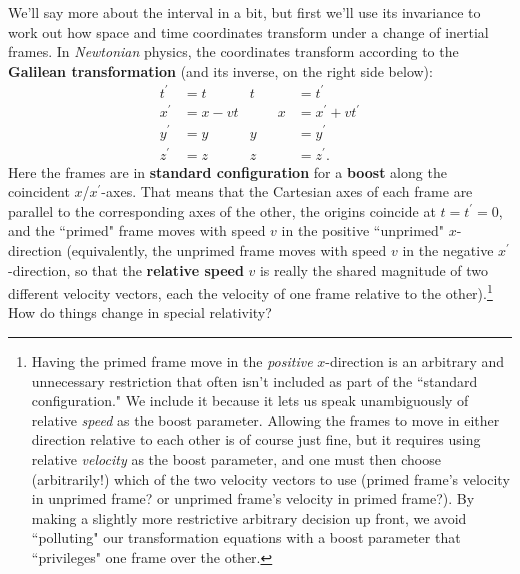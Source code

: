 \documentclass[12pt]{article}
\begin{document}
We'll say more about the interval in a bit, but first we'll use its invariance to work out how space and time coordinates transform under a change of inertial frames. In \emph{Newtonian} physics, the coordinates transform according to the \textbf{Galilean transformation} (and its inverse, on the right side below):
\begin{equation*}
\begin{aligned}
t^{\prime} &= t& t&= t^\prime \\
x^{\prime} &= x - vt& \qquad x &= x^\prime + vt^\prime\\
y^{\prime} &= y& y&= y^\prime\\
z^{\prime} &= z& z&= z^\prime .
\end{aligned}
\end{equation*}
Here the frames are in \textbf{standard configuration} for a \textbf{boost} along the coincident $x$/$x^\prime$-axes. That means that the Cartesian axes of each frame are parallel to the corresponding axes of the other, the origins coincide at $t=t^\prime=0$, and the ``primed" frame moves with speed $v$ in the positive ``unprimed" $x$-direction (equivalently, the unprimed frame moves with speed $v$ in the negative $x^\prime$-direction, so that the \textbf{relative speed} $v$ is really the shared magnitude of two different velocity vectors, each the velocity of one frame relative to the other).\footnote{Having the primed frame move in the \emph{positive} $x$-direction is an arbitrary and unnecessary restriction that often isn't included as part of the ``standard configuration." We include it because it lets us speak unambiguously of relative \emph{speed} as the boost parameter. Allowing the frames to move in either direction relative to each other is of course just fine, but it requires using relative \emph{velocity} as the boost parameter, and one must then choose (arbitrarily!) which of the two velocity vectors to use (primed frame's velocity in unprimed frame? or unprimed frame's velocity in primed frame?). By making a slightly more restrictive arbitrary decision up front, we avoid ``polluting" our transformation equations with a boost parameter that ``privileges" one frame over the other.} How do things change in special relativity?
\end{document}
